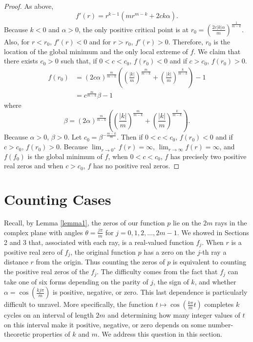 \documentclass{amsart}
\theoremstyle{definition}
\theoremstyle{remark}
\begin{document}
    \begin{proof}
   As above,
    \[ 
        f'(r) =r^{k-1}(m r^{m-k} + 2c k \alpha ).
    \]
    Because $k<0$ and $\alpha>0$, the only positive critical point is at $r_0 = \left(\frac{2c |k| \alpha }{m}\right)^\frac{1}{m-k}$. Also, for $r < r_0$, $f'(r) < 0$ and for $r > r_0$, $f'(r)>0$. Therefore, $r_0$ is the location of the global minimum and the only local extreme of $f$. We claim that there exists $c_0>0$ such that, if $0<c<c_0$, $f(r_0)<0$ and if $c>c_0$, $f(r_0)>0$.
    \begin{align*}
        f(r_0) &= (2c \alpha)^\frac{m}{m-k} \left(  \left( \frac{|k|}{m}\right)^\frac{m}{m-k}  +\left(\frac{|k|}{m} \right)^\frac{k}{m-k}    \right)-1\\
        &=c^\frac{m}{m-k} \beta - 1
    \end{align*}
    where
    \[
    \beta = (2 \alpha)^\frac{m}{m-k}\left(  \left( \frac{|k|}{m}\right)^\frac{m}{m-k}  +\left(\frac{|k|}{m} \right)^\frac{k}{m-k}    \right).
    \]
    Because $\alpha > 0$, $\beta >0$. Let $c_0=\beta^{-\frac{m-k}{m}}$. Then if $0<c<c_0$, $f(r_0)<0$ and if $c>c_0$, $f(r_0)>0$. Because $\lim_{r \to 0^+} f(r) = \infty$, $\lim_{r \to \infty} f(r)= \infty$, and $f(f_0)$ is the global minimum of $f$, when $0<c < c_0$, $f$ has precisely two positive real zeros and when $c>c_0$, $f$ has no positive real zeros. 
    \end{proof}

\section{Counting Cases}

Recall, by Lemma \ref{lemma1}, the zeros of our function $p$ lie on the $2m$ rays in the complex plane with angles $\theta = \frac{j\pi}{m}$ for $j = 0,1,2, \dots,  2m-1$. We showed in Sections 2 and 3 that, associated with each ray, is a real-valued function $f_j$. When $r$ is a positive real zero of $f_j$, the original function $p$ has a zero on the $j$-th ray a distance $r$ from the origin. Thus counting the zeros of $p$ is equivalent to counting the positive real zeros of the $f_j$. The difficulty comes from the fact that $f_j$ can take one of six forms depending on the parity of $j$, the sign of $k$, and whether $\alpha = \cos \left(\frac{k j \pi}{m} \right)$ is positive, negative, or zero. This last dependence is particularly difficult to unravel. More specifically, the function $t \mapsto \cos \left( \frac{k \pi}{m} t \right)$ completes $k$ cycles on an interval of length $2m$ and determining how many integer values of $t$ on this interval make it positive, negative, or zero depends on some number-theoretic properties of $k$ and $m$. We address this question in this section. 
\end{document}
